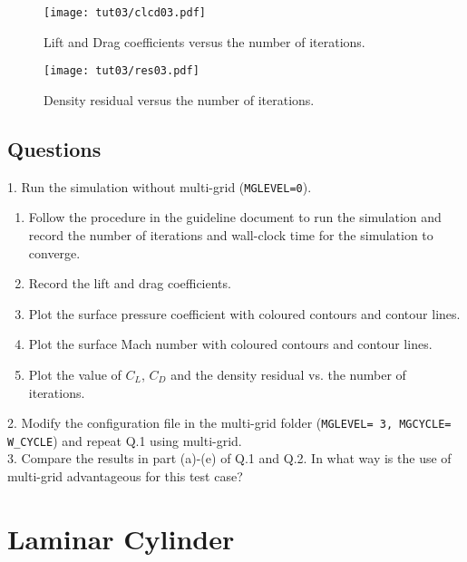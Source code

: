 \begin{figure}[ht]
    \centering
    \texttt{[image: tut03/clcd03.pdf]}
    \caption{Lift and Drag coefficients versus the number of iterations.}
    \label{fig3:clcdxlxs}
\end{figure}
\begin{figure}[H]
    \centering
    \texttt{[image: tut03/res03.pdf]}
    \caption{Density residual versus the number of iterations.}
    \label{fig3:res_vs_itr}
\end{figure}
\section{Questions}
1. Run the simulation without multi-grid (\texttt{MGLEVEL=0}).
\begin{enumerate}[label=(\alph*)]
    \item Follow the procedure in the guideline document to run the simulation and record the number of iterations and wall-clock time for the simulation to converge.
    \item Record the lift and drag coefficients.
    \item Plot the surface pressure coefficient with coloured contours and contour lines.
    \item Plot the surface Mach number with coloured contours and contour lines.
    \item Plot the value of $C_L$, $C_D$ and the density residual vs. the number of iterations.
\end{enumerate}
2. Modify the configuration file in the multi-grid folder (\texttt{MGLEVEL= 3, MGCYCLE= W\_CYCLE}) and repeat Q.1 using multi-grid.\\
3. Compare the results in part (a)-(e) of Q.1 and Q.2. In what way is the use of multi-grid advantageous for this test case?\\
\chapter{Laminar Cylinder}
\label{ch:Laminar Cylinder}
